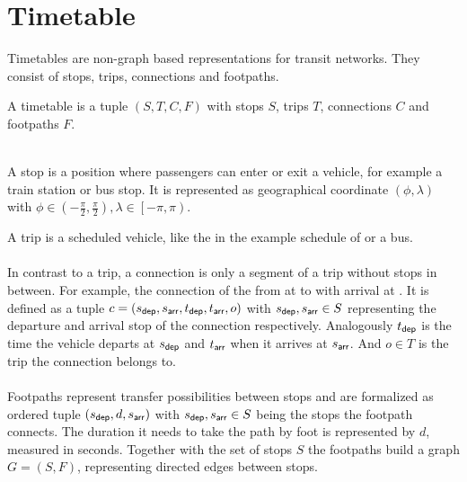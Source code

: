 \section{Timetable}\label{timetable_sec}
	Timetables  are non-graph based representations for transit networks.
	They consist of stops, trips, connections and footpaths.
	\begin{mydef}\label{timetable}
		A \textnormal{timetable} is a tuple $(S, T, C, F)$ with stops $S$, trips $T$, connections $C$ and footpaths $F$.
	\end{mydef}\quad\\
	A stop is a position where passengers can enter or exit a vehicle, for example a train station or bus stop.
	It is represented as geographical coordinate $(\phi, \lambda)$ with $\phi \in \left(-\frac{\pi}{2}, \frac{\pi}{2}\right),
	\lambda \in \left[-\pi, \pi\right)$.
	
	A trip is a scheduled vehicle, like the \ticef in the example schedule of  or a bus.\\\\
	In contrast to a trip, a connection is only a segment of a trip without stops in between. For example, the connection
	of the \ticef from \freiburg at  to \offenburg with arrival at .
	It is defined as a tuple $c = (s_{\textsf{dep}}, s_{\textsf{arr}}, t_{\textsf{dep}}, t_{\textsf{arr}}, o)$ with $s_{\textsf{dep}}, s_{\textsf{arr}} \in S$ representing the
	departure and arrival stop of the connection respectively. Analogously $t_{\textsf{dep}}$ is the time the vehicle departs
	at $s_{\textsf{dep}}$ and $t_{\textsf{arr}}$ when it arrives at $s_{\textsf{arr}}$. And $o \in T$ is the trip the connection belongs to.\\\\
	Footpaths represent transfer possibilities between stops and are formalized as ordered tuple $(s_{\textsf{dep}}, d, s_{\textsf{arr}})$ with
	$s_{\textsf{dep}}, s_{\textsf{arr}} \in S$ being the stops the footpath connects. The duration it needs to take the path by foot is
	represented by $d$, measured in seconds. Together with the set of stops $S$ the footpaths build a graph $G = (S, F)$,
	representing directed edges between stops.
	
